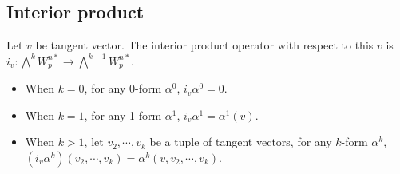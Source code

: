 \documentclass[11pt, a4paper]{book}
\begin{document}
\subsection{Interior product}

\begin{Definition}
  \label{def:interior-product}
  Let $v$ be tangent vector. The interior product operator with respect to this $v$ is
  $i_v: \bigwedge^k W_p^{n*} \rightarrow \bigwedge^{k-1} W_p^{n*}$.
  \begin{itemize}
  \item When $k=0$, for any 0-form $\alpha^0$, $i_v\alpha^0 = 0$.
  \item When $k=1$, for any 1-form $\alpha^1$, $i_v\alpha^1 = \alpha^1(v)$.
  \item When $k>1$, let $v_2,\cdots,v_k$ be a tuple of tangent vectors, for any $k$-form
    $\alpha^k$, $(i_v\alpha^k)(v_2,\cdots,v_k) = \alpha^k(v,v_2,\cdots,v_k)$.
  \end{itemize}   
\end{Definition}
\end{document}
